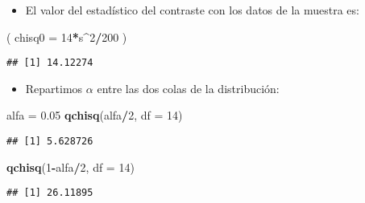 \documentclass[]{article}
\newenvironment{Shaded}{\begin{snugshade}}{\end{snugshade}}
\newcommand{\KeywordTok}[1]{\textcolor[rgb]{0.13,0.29,0.53}{\textbf{#1}}}
\newcommand{\DataTypeTok}[1]{\textcolor[rgb]{0.13,0.29,0.53}{#1}}
\newcommand{\DecValTok}[1]{\textcolor[rgb]{0.00,0.00,0.81}{#1}}
\newcommand{\FloatTok}[1]{\textcolor[rgb]{0.00,0.00,0.81}{#1}}
\newcommand{\StringTok}[1]{\textcolor[rgb]{0.31,0.60,0.02}{#1}}
\newcommand{\OperatorTok}[1]{\textcolor[rgb]{0.81,0.36,0.00}{\textbf{#1}}}
\newcommand{\NormalTok}[1]{#1}
\providecommand{\tightlist}{%
  \setlength{\itemsep}{0pt}\setlength{\parskip}{0pt}}
\begin{document}
\begin{itemize}
\tightlist
\item
  El valor del estadístico del contraste con los datos de la muestra es:
\end{itemize}

\begin{Shaded}
\begin{Highlighting}[]
\NormalTok{( }\DataTypeTok{chisq0 =} \DecValTok{14}\OperatorTok{*}\NormalTok{s}\OperatorTok{^}\DecValTok{2}\OperatorTok{/}\DecValTok{200}\NormalTok{ )}
\end{Highlighting}
\end{Shaded}

\begin{verbatim}
## [1] 14.12274
\end{verbatim}

\begin{itemize}
\tightlist
\item
  Repartimos \(\alpha\) entre las dos colas de la distribución:
\end{itemize}

\begin{Shaded}
\begin{Highlighting}[]
\NormalTok{alfa =}\StringTok{ }\FloatTok{0.05}
\KeywordTok{qchisq}\NormalTok{(alfa}\OperatorTok{/}\DecValTok{2}\NormalTok{, }\DataTypeTok{df =} \DecValTok{14}\NormalTok{)}
\end{Highlighting}
\end{Shaded}

\begin{verbatim}
## [1] 5.628726
\end{verbatim}

\begin{Shaded}
\begin{Highlighting}[]
\KeywordTok{qchisq}\NormalTok{(}\DecValTok{1}\OperatorTok{-}\NormalTok{alfa}\OperatorTok{/}\DecValTok{2}\NormalTok{, }\DataTypeTok{df =} \DecValTok{14}\NormalTok{)}
\end{Highlighting}
\end{Shaded}

\begin{verbatim}
## [1] 26.11895
\end{verbatim}
\end{document}
